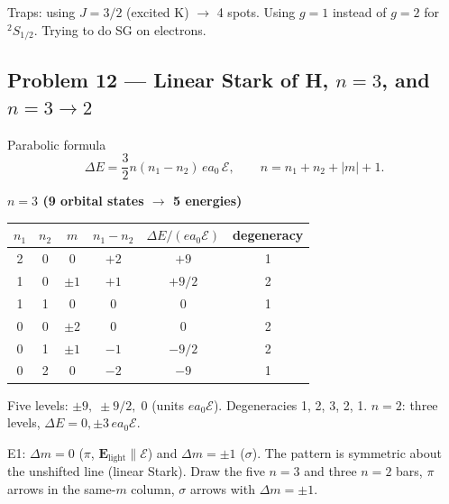 \documentclass[11pt,a4paper]{article}
\begin{document}
Traps: using \(J=3/2\) (excited K) \(\to\) 4 spots. Using \(g=1\) instead of \(g=2\) for \({}^2S_{1/2}\). Trying to do SG on electrons.

\subsection{Problem 12 --- Linear Stark of H, \(n=3\), and \(n=3\to 2\)}
Parabolic formula
\[
\Delta E=\frac32 n(n_1-n_2)\,e a_0\,\mathcal{E},\qquad
n=n_1+n_2+|m|+1.
\]

\textbf{\(n=3\) (9 orbital states \(\to\) 5 energies)}

\begin{center}
\small
\begin{tabular}{@{}cccccc@{}}
\toprule
\(n_1\) & \(n_2\) & \(m\) & \(n_1-n_2\) & \(\Delta E/(e a_0\mathcal{E})\) & degeneracy \\
\midrule
2 & 0 & 0 & \(+2\) & \(+9\) & 1 \\
1 & 0 & \(\pm 1\) & \(+1\) & \(+9/2\) & 2 \\
1 & 1 & 0 & 0 & 0 & 1 \\
0 & 0 & \(\pm 2\) & 0 & 0 & 2 \\
0 & 1 & \(\pm 1\) & \(-1\) & \(-9/2\) & 2 \\
0 & 2 & 0 & \(-2\) & \(-9\) & 1 \\
\bottomrule
\end{tabular}
\end{center}
Five levels: \(\pm 9,\;\pm 9/2,\;0\) (units \(e a_0\mathcal{E}\)). Degeneracies 1, 2, 3, 2, 1.
\(n=2\): three levels, \(\Delta E=0,\pm 3\,e a_0\mathcal{E}\).

\begin{center}
\end{center}

E1: \(\Delta m=0\) (\(\pi\), \(\mathbf{E}_{\mathrm{light}}\parallel\boldsymbol{\mathcal{E}}\)) and \(\Delta m=\pm 1\) (\(\sigma\)).
The pattern is symmetric about the unshifted line (linear Stark). Draw the five \(n=3\) and three \(n=2\) bars, \(\pi\) arrows in the same-\(m\) column, \(\sigma\) arrows with \(\Delta m=\pm 1\).
\end{document}
